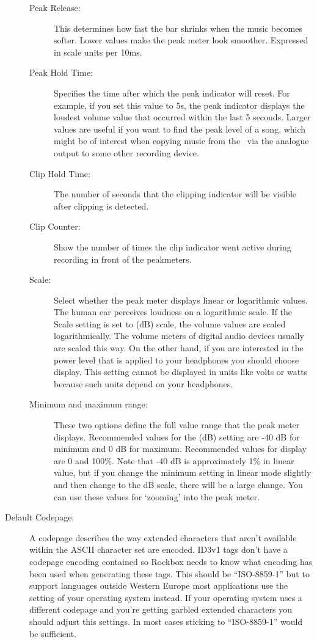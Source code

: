 \begin{description}
{      \begin{description}
      \item[Peak Release:]
        This determines how fast the bar shrinks when the music becomes
        softer. Lower values make the peak meter look smoother.
        Expressed in scale units per 10ms.
      \item[Peak Hold Time:]
        Specifies the time after which the peak indicator will reset.
        For example, if you set this value to 5s, the peak indicator displays
        the loudest volume value that occurred within the last 5 seconds.
        Larger values are useful if you want to find the peak level of a song,
        which might be of interest when copying music from the \dap\ via the
        analogue output to some other recording device.
      \item[Clip Hold Time:]
        The number of seconds that the clipping indicator will be visible
        after clipping is detected.
      \item[Clip Counter:]
        Show the number of times the clip indicator went active during recording
        in front of the peakmeters.
      \item[Scale:]
        Select whether the peak meter displays linear or logarithmic values.
        The human ear perceives loudness on a logarithmic scale. If the Scale
        setting is set to  (dB) scale, the volume values
        are scaled logarithmically. The volume meters of digital audio
        devices usually are scaled this way. On the other hand, if you
        are interested in the power level that is applied to your headphones
        you should choose  display. This setting cannot be
        displayed in units like volts or watts because such units depend
        on your headphones.
      \item[Minimum and maximum range:]
        These two options define the full value range that the peak meter
        displays. Recommended values for the  (dB) setting
        are {}-40 dB for minimum and 0 dB for maximum. Recommended values
        for  display are 0 and 100\%. Note that {}-40 dB is
        approximately 1\% in linear value, but if you change the minimum
        setting in linear mode slightly and then change to the dB scale,
        there will be a large change. You can use these values for `zooming'
        into the peak meter.
      \end{description}
    }
    \item[Default Codepage:]
      A codepage describes the way extended characters that aren't available
      within the ASCII character set are encoded. ID3v1 tags don't have a
      codepage encoding contained so Rockbox needs to know what encoding has
      been used when generating these tags. This should be ``ISO-8859-1'' but
      to support languages outside Western Europe most applications use
      the setting of your operating system instead. If your operating system
      uses a different codepage and you're getting garbled extended characters
      you should adjust this settings. In most cases sticking to
      ``ISO-8859-1'' would be sufficient.
  \end{description}
